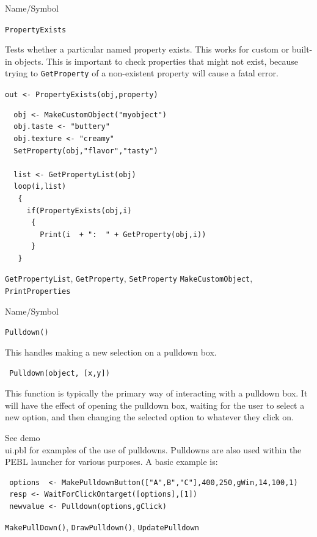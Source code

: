 \begin{desc}{Name/Symbol}
\item[Name/Symbol] \verb+PropertyExists+ 

\item[Description]  
Tests whether a particular named property exists. This works for custom or built-in objects. This is important to check properties that might not exist, because trying to \verb+GetProperty+ of a non-existent property will cause a fatal error.
  
\item[Usage]       
     \verb+out <- PropertyExists(obj,property)+ 
\item[Example]

\begin{verbatim}
  obj <- MakeCustomObject("myobject")
  obj.taste <- "buttery"
  obj.texture <- "creamy"
  SetProperty(obj,"flavor","tasty")
  
  list <- GetPropertyList(obj)
  loop(i,list)
   {
     if(PropertyExists(obj,i)
      {
        Print(i  + ":  " + GetProperty(obj,i))
      }
   }

\end{verbatim}


\item[See Also]
\verb+GetPropertyList+, \verb+GetProperty+, \verb+SetProperty+ \verb+MakeCustomObject+, \verb+PrintProperties+ 
\end{desc} 


\begin{desc}{Name/Symbol}
\item[Name/Symbol]  	\verb+Pulldown()+

\item[Description]	
This handles making a new selection on a pulldown box.

\item[Usage]
\begin{verbatim}
 Pulldown(object, [x,y])
\end{verbatim}

This function is typically the primary way of interacting with a pulldown box. It will have the effect of opening the pulldown box, waiting for the user to select a new option, and then changing the selected option to whatever they click on.

\item[Example]      	
See demo\\ui.pbl for examples of the use of pulldowns.  Pulldowns are also used within the PEBL launcher for various purposes.  A basic example is:

\begin{verbatim}
 options  <- MakePulldownButton(["A",B","C"],400,250,gWin,14,100,1)
 resp <- WaitForClickOntarget([options],[1])
 newvalue <- Pulldown(options,gClick) 
\end{verbatim}

\item[See Also]	\verb+MakePullDown()+, \verb+DrawPulldown()+, \verb+UpdatePulldown+
\end{desc}



